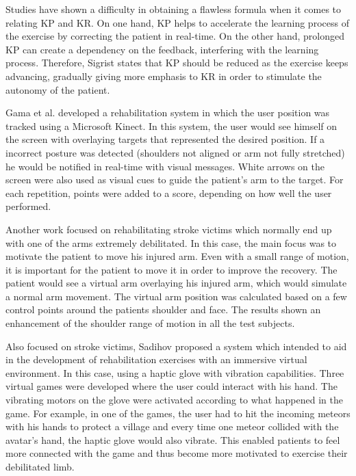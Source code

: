 Studies have shown a difficulty in obtaining a flawless formula when it comes to relating \ac{KP} and \ac{KR}. 
On one hand, \ac{KP} helps to accelerate the learning process of the exercise by correcting the patient in
real-time. On the other hand, prolonged \ac{KP} can create a dependency on the feedback, interfering with the 
learning process. Therefore, Sigrist \cite{Sigrist2013} states that \ac{KP} should be reduced as the exercise
keeps advancing, gradually giving more emphasis to \ac{KR} in order to stimulate the autonomy of the patient.

Gama et al. \cite{Gama2012a} developed a rehabilitation system in which the user position was tracked using a 
Microsoft Kinect. In this system, the user would see himself on the screen with overlaying targets that represented the desired position. 
If a incorrect posture was detected (shoulders not aligned or arm not fully stretched) he would be notified in real-time with visual messages. 
White arrows on the screen were also used as visual cues to guide the patient's arm to the target.
For each repetition, points were added to a score, depending on how well the user performed.

Another work \cite{Klein2013} focused on rehabilitating stroke victims which normally end up with one of the arms extremely debilitated.
In this case, the main focus was to motivate the patient to move his injured arm. Even with a small range of motion, it is 
important for the patient to move it in order to improve the recovery. The patient would see a virtual arm overlaying his injured arm, which would simulate a normal arm movement. 
The virtual arm position was calculated based on a few control points around the patients shoulder and face. 
The results shown an enhancement of the shoulder range of motion in all the test subjects.

Also focused on stroke victims, Sadihov \cite{Sadihov2013} proposed a system which intended to aid in the development of 
rehabilitation exercises with an immersive virtual environment. In this case, using a haptic glove with vibration capabilities.  
Three virtual games were developed where the user could interact with his hand. The vibrating motors on the glove 
were activated according to what happened in the game. For example, in one of the games, the user had to hit 
the incoming meteors with his hands to protect a village and every time one meteor collided with the avatar's hand,
the haptic glove would also vibrate. This enabled patients to feel more connected with the game and thus become more motivated to exercise their debilitated limb.

